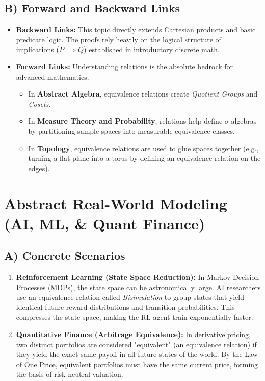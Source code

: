 \documentclass[11pt, a4paper]{article}
\theoremstyle{definition}
\theoremstyle{remark}
\begin{document}
\subsection{B) Forward and Backward Links}
\begin{itemize}
    \item \textbf{Backward Links:} This topic directly extends Cartesian products and basic predicate logic. The proofs rely heavily on the logical structure of implications ($P \implies Q$) established in introductory discrete math.
    \item \textbf{Forward Links:} Understanding relations is the absolute bedrock for advanced mathematics. 
    \begin{itemize}
        \item In \textbf{Abstract Algebra}, equivalence relations create \textit{Quotient Groups} and \textit{Cosets}.
        \item In \textbf{Measure Theory and Probability}, relations help define $\sigma$-algebras by partitioning sample spaces into measurable equivalence classes.
        \item In \textbf{Topology}, equivalence relations are used to glue spaces together (e.g., turning a flat plane into a torus by defining an equivalence relation on the edges).
    \end{itemize}
\end{itemize}

\section{Abstract Real-World Modeling (AI, ML, \& Quant Finance)}

\subsection{A) Concrete Scenarios}
\begin{enumerate}
    \item \textbf{Reinforcement Learning (State Space Reduction):} In Markov Decision Processes (MDPs), the state space can be astronomically large. AI researchers use an equivalence relation called \textit{Bisimulation} to group states that yield identical future reward distributions and transition probabilities. This compresses the state space, making the RL agent train exponentially faster.
    \item \textbf{Quantitative Finance (Arbitrage Equivalence):} In derivative pricing, two distinct portfolios are considered "equivalent" (an equivalence relation) if they yield the exact same payoff in all future states of the world. By the Law of One Price, equivalent portfolios must have the same current price, forming the basis of risk-neutral valuation.
\end{enumerate}
\end{document}
